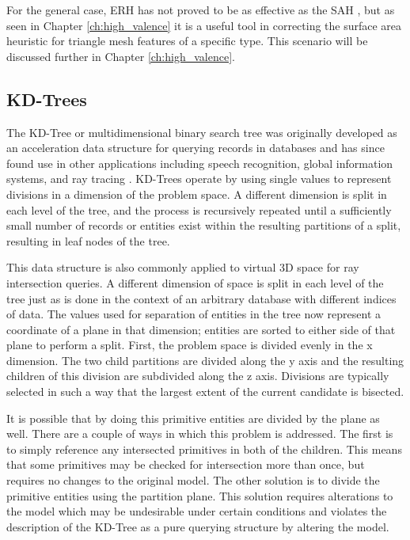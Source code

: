 For the general case, ERH has not proved to be as effective as the SAH
\cite{Bittner_2013}, but as
seen in Chapter \ref{ch:high_valence} it is a useful tool in correcting the
surface area heuristic for triangle mesh features of a specific type. This
scenario will be discussed further in Chapter \ref{ch:high_valence}.

\subsection{KD-Trees}
\label{subsec:kd-trees}
The KD-Tree or multidimensional binary search tree was originally developed as
an acceleration data structure for querying records in databases and has since
found use in other applications including speech recognition, global information
systems, and ray tracing \cite{Bentley_1975}. KD-Trees operate by using single
values to represent divisions in a dimension of the problem space. A different
dimension is split in each level of the tree, and the process is recursively
repeated until a sufficiently small number of records or entities exist within
the resulting partitions of a split, resulting in leaf nodes of the tree.

This data structure is also commonly applied to virtual 3D space for ray
intersection queries. A different dimension of space is split in each level of
the tree just as is done in the context of an arbitrary database with different
indices of data. The values used for separation of entities in the tree now
represent a coordinate of a plane in that dimension; entities are sorted to
either side of that plane to perform a split. First, the problem space is
divided evenly in the x dimension. The two child partitions are divided along
the y axis and the resulting children of this division are subdivided along the
z axis. Divisions are typically selected in such a way that the largest extent
of the current candidate is bisected.

It is possible that by doing this primitive entities are divided by the plane as
well. There are a couple of ways in which this problem is addressed. The first
is to simply reference any intersected primitives in both of the children. This
means that some primitives may be checked for intersection more than once, but
requires no changes to the original model. The other solution is to divide the
primitive entities using the partition plane.  This solution requires
alterations to the model which may be undesirable under certain conditions and
violates the description of the KD-Tree as a pure querying structure by altering
the model.

